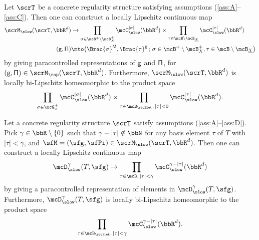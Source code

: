 \begin{thm}
Let $\scrT$ be a concrete regularity structure satisfying assumptions \hbox{\textup{(\ref{ass:A}--\ref{ass:C})}}. Then one can construct a locally Lipschitz continuous map
\begin{equation} \begin{split}
\scrM_\slow(\scrT, \bbR^d) &\to
\prod_{\sigma\in\mcB^+\setminus\mcB_X^+} \mcC_\slow^{|\sigma|}(\bbR^d) \times \prod_{\tau\in\mcB\setminus\mcB_{\underline{X}}} \mcC_\slow^{|\tau|}(\bbR^d) \\
{\sf (g,\Pi)} &\mto \bigl(\Brac{\sigma}^{\sf M}, \Brac{\tau}^{\sf g}\,;\, \sigma\in\mcB^+\setminus\mcB_X^+, \tau\in\mcB\setminus\mcB_{\underline{X}} \bigr)
\end{split} \end{equation}
by giving paracontrolled representations of $\sf g$ and $\sf \Pi$, for $({\sf g}, {\sf \Pi})\in \scrM_\rap(\scrT, \bbR^d)$. Furthermore, $\scrM_\slow(\scrT, \bbR^d)$ is locally bi-Lipschitz homeomorphic to the product space
\begin{align*}
\prod_{\sigma\in\mcG_\circ^+} \mcC_\slow^{|\sigma|}(\bbR^d) \times \prod_{\tau\in\mcB_\sbullet,\,|\tau|<0} \mcC_\slow^{|\tau|}(\bbR^d).
\end{align*}
\end{thm}

\begin{thm}
Let a concrete regularity structure $\scrT$ satisfy assumptions \textup{(\ref{ass:A}--\ref{ass:D})}. Pick $\gamma\in\bbR\setminus\{0\}$ such that $\gamma-|\tau|\notin\bbN$ for any basis element $\tau$ of $T$ with $|\tau|<\gamma$, and $\sfM=(\sfg,\sfPi)\in\scrM_\slow(\scrT, \bbR^d)$. Then one can construct a locally Lipschitz continuous map
\[
\mcD_\slow^\gamma(T,\sfg) \to \prod_{\tau\in\mcB,\, |\tau|<\gamma} \mcC_\slow^{\gamma-|\tau|}(\bbR^d)
\]
by giving a paracontrolled representation of elements in $\mcD_\slow^\gamma(T,\sfg)$. Furthermore, $\mcD_\slow^\gamma(T, \sfg)$ is locally bi-Lipschitz homeomorphic to the product space
\[
\prod_{\tau\in\mcB_\sbullet,\, |\tau|<\gamma} \mcC_\slow^{\gamma-|\tau|}(\bbR^d).
\]
\end{thm}

